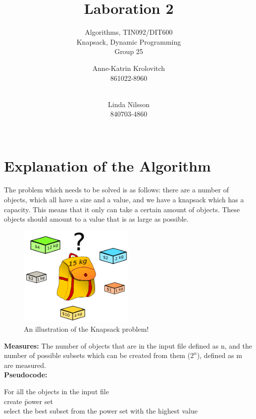 \documentclass{inc/mas}
\title{Laboration 2 }
\subtitle{Algorithms, TIN092/DIT600\\ Knapsack, Dynamic Programming \\ Group 25}
\affiliation{}
\begin{document}
\author{Anne-Katrin Krolovitch \\ 861022-8960\\ \\ \and
Linda Nilsson \\ 840703-4860 \\ \\ \tabularnewline
}
\maketitle
\section{Explanation of the Algorithm} 
 \noindent The problem which needs to be solved is as follows: there are a number of objects, which all have a size and a value, and we have a knapsack which has a capacity. This means that it only can take a certain amount of objects. These objects should amount to a value that is as large as possible.\\

\begin{figure}[h!]
  \centering
      \includegraphics[width=0.5\textwidth]{Knapsack.png}
  \caption{An illustration of the Knapsack problem! \citep{wikipic} }
\end{figure}



\textbf{Measures:} The number of objects that are in the input file defined as n, and the number of possible subsets which can be created from them ($2^n$), defined as m are measured.\\

\noindent \textbf{Pseudocode:}
\begin{tabbing}
For \= all the objects in the input file \\
\> create \= power set	\\
\> select the best subset from the power set with the highest value\\
\end{tabbing}
\end{document}

